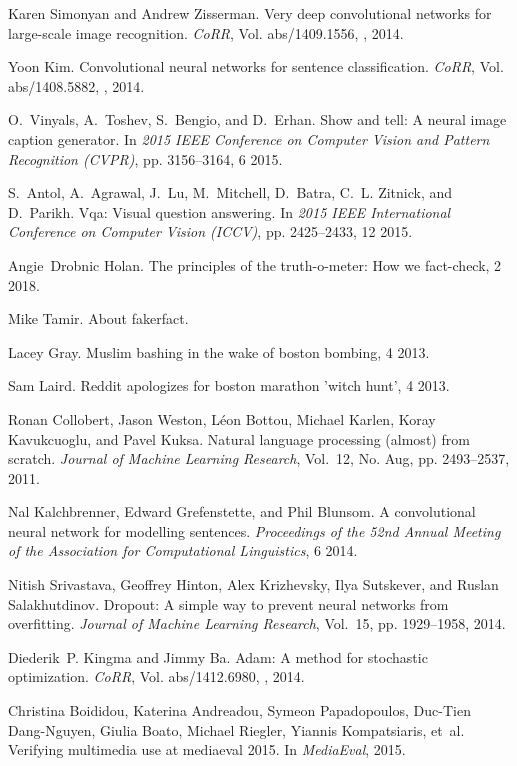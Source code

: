 \begin{thebibliography}{10}
Karen Simonyan and Andrew Zisserman.
 Very deep convolutional networks for large-scale image recognition.
 {\em CoRR}, Vol. abs/1409.1556, , 2014.

Yoon Kim.
 Convolutional neural networks for sentence classification.
 {\em CoRR}, Vol. abs/1408.5882, , 2014.

O.~Vinyals, A.~Toshev, S.~Bengio, and D.~Erhan.
 Show and tell: A neural image caption generator.
 In {\em 2015 IEEE Conference on Computer Vision and Pattern
  Recognition (CVPR)}, pp. 3156--3164, 6 2015.

S.~Antol, A.~Agrawal, J.~Lu, M.~Mitchell, D.~Batra, C.~L. Zitnick, and
  D.~Parikh.
 Vqa: Visual question answering.
 In {\em 2015 IEEE International Conference on Computer Vision
  (ICCV)}, pp. 2425--2433, 12 2015.

Angie~Drobnic Holan.
 The principles of the truth-o-meter: How we fact-check, 2 2018.

Mike Tamir.
 About fakerfact.

Lacey Gray.
 Muslim bashing in the wake of boston bombing, 4 2013.

Sam Laird.
 Reddit apologizes for boston marathon 'witch hunt', 4 2013.

Ronan Collobert, Jason Weston, L{\'e}on Bottou, Michael Karlen, Koray
  Kavukcuoglu, and Pavel Kuksa.
 Natural language processing (almost) from scratch.
 {\em Journal of Machine Learning Research}, Vol.~12, No. Aug, pp.
  2493--2537, 2011.

Nal Kalchbrenner, Edward Grefenstette, and Phil Blunsom.
 A convolutional neural network for modelling sentences.
 {\em Proceedings of the 52nd Annual Meeting of the Association for
  Computational Linguistics}, 6 2014.

Nitish Srivastava, Geoffrey Hinton, Alex Krizhevsky, Ilya Sutskever, and Ruslan
  Salakhutdinov.
 Dropout: A simple way to prevent neural networks from overfitting.
 {\em Journal of Machine Learning Research}, Vol.~15, pp. 1929--1958,
  2014.

Diederik~P. Kingma and Jimmy Ba.
 Adam: {A} method for stochastic optimization.
 {\em CoRR}, Vol. abs/1412.6980, , 2014.

Christina Boididou, Katerina Andreadou, Symeon Papadopoulos, Duc-Tien
  Dang-Nguyen, Giulia Boato, Michael Riegler, Yiannis Kompatsiaris, et~al.
 Verifying multimedia use at mediaeval 2015.
 In {\em MediaEval}, 2015.


\end{thebibliography}
